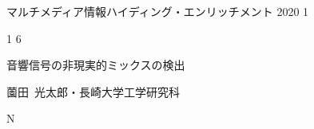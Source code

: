\documentclass[a4paper,uplatex,12pt]{jsarticle}
\begin{document}
\vspace*{-7.5zh}\hspace*{-5zw}
{\small マルチメディア情報ハイディング・エンリッチメント}
\hspace*{8zw}
2020
\hspace*{2zw}
1

\vspace{3zh}

\begin{minipage}[t]{0.5\textwidth}
	\hspace*{-3zw}
	\phantom{投稿締切日}
	1
	\phantom{月}\hspace{1zw}
	6
	\phantom{日}
\end{minipage}
\begin{minipage}[t]{0.5\textwidth}
	\phantom{EMM-000}
\end{minipage}	

\vspace*{6zh}
音響信号の非現実的ミックスの検出

\vspace*{7zh}
薗田~光太郎・長崎大学工学研究科

\vspace*{2zh}
\hspace*{1.5zw}
N
\phantom{枚}
\end{document}
